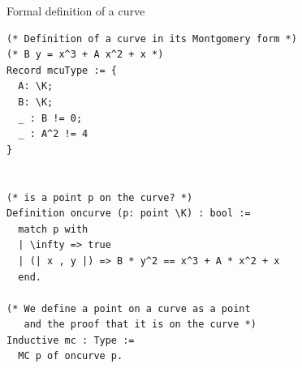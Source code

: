 \documentclass[8pt]{beamer}
\begin{document}
\begin{frame}[fragile]{Formal definition of a curve}
\begin{center}
\begin{lstlisting}[language=Coq, basicstyle=\normalsize]
(* Definition of a curve in its Montgomery form *)
(* B y = x^3 + A x^2 + x *)
Record mcuType := {
  A: \K;
  B: \K;
  _ : B != 0;
  _ : A^2 != 4
}


(* is a point p on the curve? *)
Definition oncurve (p: point \K) : bool :=
  match p with
  | \infty => true
  | (| x , y |) => B * y^2 == x^3 + A * x^2 + x
  end.

(* We define a point on a curve as a point
   and the proof that it is on the curve *)
Inductive mc : Type :=
  MC p of oncurve p.
\end{lstlisting}
\end{center}
\end{frame}
%
%
%
%
%
%

%
%
\end{document}
